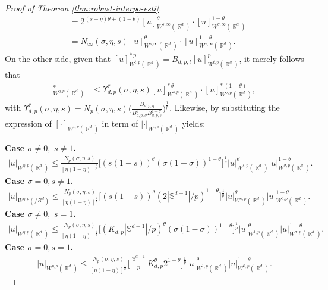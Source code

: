 \documentclass[12pt, reqno]{amsart}%
\theoremstyle{plain}  %
\theoremstyle{definition}  %
\theoremstyle{remark}
\numberwithin{equation}{section}
\DeclareMathOperator{\R}{\mathbb{R}}
\begin{document}
\begin{proof}[Proof of Theorem \ref{thm:robust-interpo-esti}]
\begin{align*}
&=2^{(s-\eta)\theta+(1-\theta)}[u]_{W^{s,\infty} (\R^d)}^{\theta } \cdot
[u]_{W^{\sigma,\infty} (\R^d)}^{1 - \theta}\\
&= N_\infty(\sigma, \eta, s)[u]_{W^{s,\infty} (\R^d)}^{\theta } \cdot
[u]_{W^{\sigma,\infty} (\R^d)}^{1 - \theta}.
\end{align*}
On the other side, given that $[u]^{*\,p}_{W^{t,p}(\R^d)}= B_{d,p,t} [u]^p_{W^{t,p}(\R^d)}$, it merely follows that
\begin{align*}
[u]^*_{W^{\eta,p} (\R^d)}
&\leq \Upsilon^*_{d,p}(\sigma, \eta, s)
[u]^{*\, \theta }_{W^{s,p} (\R^d)} \cdot
[u]^{*\,(1 - \theta)}_{W^{\sigma,p} (\R^d)},
\end{align*}
with $\Upsilon^*_{d,p}(\sigma, \eta, s)= N_p(\sigma, \eta, s) \Big(\frac{B_{d,p,\eta}}{B_{d,p,\sigma}^{\theta}B_{d,p,s}^{1-\theta}} \Big)^{\frac{1}{p}}$. Likewise, by substituting the expression of $[\cdot]_{W^{t,p}(\R^d)}$ in term of $|\cdot|_{W^{t,p}(\R^d)}$ yields:

\textbf{Case $\sigma\neq 0,\,\, s\neq 1$.}
\begin{align*}
|u|_{W^{\eta,p}(\R^d)} \leq
\frac{ N_p(\sigma,\eta,s)}{[\eta(1-\eta)]^{\frac{1}{p}}}  \Big[ (s(1-s))^\theta (\sigma(1-\sigma))^{1-\theta}\Big]^{\frac{1}{p}}
|u|_{W^{s,p}(\R^d)}^{\theta} |u|_{W^{\sigma,p}(\R^d)}^{1-\theta}.
\end{align*}
\textbf{Case  $\sigma=0, s\neq 1$.}
\begin{align*}
|u|_{W^{\eta,p}(/R^d)} \leq\frac{ N_p(\sigma,\eta,s)}{[\eta(1-\eta)]^{\frac{1}{p}}}  \Big[ (s(1-s))^\theta (2|\mathbb{S}^{d-1}|/p)^{1-\theta} \Big]^{\frac{1}{p}}
|u|_{W^{s,p}(\R^d)}^\theta |u|_{W^{0,p}(\R^d)}^{1-\theta}.
\end{align*}
\textbf{Case $\sigma\neq 0,\,\,  s=1$.}
\begin{align*}
|u|_{W^{\eta,p}(\R^d)} \leq \frac{ N_p(\sigma,\eta,s)}{[\eta(1-\eta)]^{\frac{1}{p}}}  \Big[ (K_{d,p} |\mathbb{S}^{d-1}|/p)^\theta (\sigma(1-\sigma))^{1-\theta}\Big]^{\frac{1}{p}}
|u|_{W^{1,p}(\R^d)}^\theta |u|_{W^{\sigma,p}(\R^d)}^{1-\theta}.
\end{align*}
\textbf{Case $\sigma=0, s=1$.}
\begin{align*}
|u|_{W^{\eta,p}(\R^d)} \leq \frac{ N_p(\sigma,\eta,s)}{[\eta(1-\eta)]^{\frac{1}{p}}}
 \Big[  \frac{|\mathbb{S}^{d-1}|}{p}K_{d,p}^\theta 2^{1-\theta} \Big]^{\frac{1}{p}}
|u|_{W^{1,p}(\R^d)}^\theta |u|_{W^{0,p}(\R^d)}^{1-\theta}.
\end{align*}
\end{proof}
\end{document}
